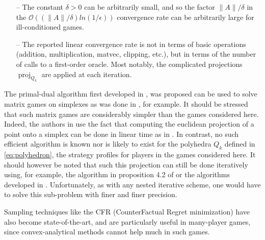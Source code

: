 \documentclass{article} %
\DeclareMathOperator{\proj}{proj}
\begin{document}
\begin{itemize}
\item[--] The constant $\delta > 0$ can be arbitrarily small, and so
  the factor $\|A\| / \delta$ in the $\mathcal{O}\left(\left(\|A\| /
\delta\right) ln\left(1 / \epsilon\right)\right)$ convergence rate can
be arbitrarily large for ill-conditioned games.
\item[--] The reported linear convergence rate is not in terms of
  basic operations (addition, multiplication, matvec, clipping, etc.),
  but in terms of the number of calls to a first-order oracle. Most
  notably, the complicated projections $\proj_{Q_k}$ are applied at
  each iteration.%

\end{itemize}



The primal-dual algorithm first developed in \cite{chambolle2010}, was
proposed can be used to solve matrix games on
simplexes as was done in \cite{chambolle2014ergodic}, for example.
It should be stressed that such matrix games are
considerably simpler than the games considered here. Indeed, the
authors in \cite{chambolle2014ergodic} use the fact that computing the
euclidean projection of a point onto a simplex can be done in linear
time as in \cite{duchi2008efficient}. In contrast, no such efficient
algorithm is known nor is likely to exist for the polyhedra $Q_k$
defined in \eqref{eq:polyhedron}, the strategy profiles for players in
the games considered here. It should however be noted that such this
projection can still be done iteratively using, for example, the
algorithm in proposition 4.2 of \cite{combettes2010dualization} or the
algorithms developed in \cite{tran2015splitting}. Unfortunately, as
with any nested iterative scheme, one would have to solve this
sub-problem with finer and finer precision.


Sampling techniques like the CFR (CounterFactual Regret minimization)
\cite{zinkevich2008regret,lanctot2009monte,Bowling09012015} have
also become state-of-the-art, and are particularly useful in
many-player games, since convex-analytical methods cannot help much in
such games.
\end{document}
